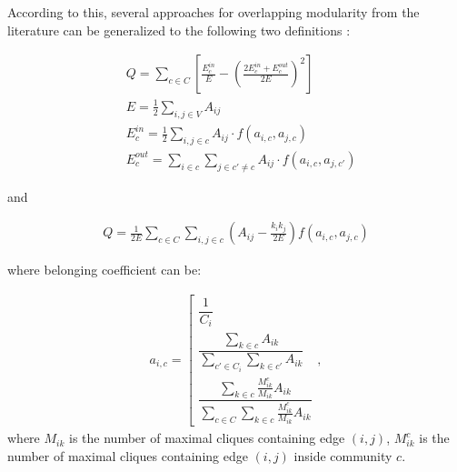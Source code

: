 \documentclass[a4paper,twocolumn]{article}
\begin{document}
According to this, several approaches for overlapping modularity from the literature can be generalized to the following two definitions \cite{Chen2015}:

\begin{equation}
\label{modularity_overlap_1}
\begin{aligned}
& Q=\sum_{c\in C}\left [ \frac{E_c^{in}}{E}-\left ( \frac{2E_c^{in} + E_c^{out}}{2E} \right )^2 \right ] \\
& E=\frac{1}{2}\sum_{i,j \in V}A_{ij} \\
& E_c^{in}=\frac{1}{2}\sum_{i,j \in c}A_{ij}\cdot f(a_{i,c},a_{j,c}) \\
& E_c^{out}=\sum_{i \in c}\sum_{j \in c' \neq c}A_{ij}\cdot f(a_{i,c},a_{j,c'})
\end{aligned}
\end{equation}

and

\begin{equation}
\label{modularity_overlap_2}
\begin{aligned}
Q=\frac{1}{2E}\sum_{c\in C}\sum_{i,j\in c}\left ( A_{ij}-\frac{k_ik_j}{2E} \right )f(a_{i,c}, a_{j,c})
\end{aligned}
\end{equation}

where belonging coefficient can be:

\begin{equation}
\label{equation:bc}
\begin{array}{cc}
a_{i,c} = \left [
\begin{matrix}
\dfrac{1}{C_i}
\\
\dfrac{\sum_{k\in c}A_{ik}}{\sum_{c'\in C_i} \sum_{k\in c'}A_{ik} }
\\
\dfrac{\sum_{k \in c}{\frac{M_{ik}^c}{M_{ik}}A_{ik}}}{\sum_{c \in C}{\sum_{k \in c}{\frac{M_{ik}^c}{M_{ik}}A_{ik}}}}
\end{matrix} \right.,
\end{array}
\end{equation}
where $M_{ik}$ is the number of maximal cliques containing edge $(i,j)$, $M_{ik}^c$ is the number of maximal cliques containing edge $(i,j)$ inside community $c$.
\end{document}
